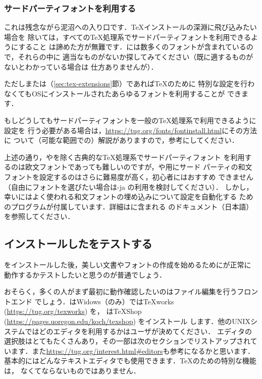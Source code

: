 \documentclass[uplatex,dvipdfmx,tombow]{jsarticle}
\begin{document}
\subsubsection{サードパーティフォントを利用する}

これは残念ながら泥沼への入り口です．\TeX インストールの深淵に飛び込みたい場合を
除いては，すべての\TeX 処理系でサードパーティフォントを利用できるようにすること
は諦めた方が無難です．\TL には数多くのフォントが含まれているので，それらの中に
適当なものがないか探してみてください（既に適するものがないとわかっている場合は
仕方ありませんが）．

ただし\XeTeX または\LuaTeX （\ref{sec:tex-extensions}節）であれば\TeX のために
特別な設定を行わなくてもOSにインストールされたあらゆるフォントを利用することが
できます．

もしどうしてもサードパーティフォントを一般の\TeX 処理系で利用できるように設定を
行う必要がある場合は，\url{https://tug.org/fonts/fontinstall.html}にその方法に
ついて（可能な範囲での）解説がありますので，参考にしてください．

\begin{janote}
上述の通り，\XeTeX や\LuaTeX を除く古典的な\TeX 処理系でサードパーティフォント
を利用するのは欧文フォントであっても難しいのですが，\pTeX や\upTeX 用にサード
パーティの和文フォントを設定するのはさらに難易度が高く，初心者にはおすすめ
できません（自由にフォントを選びたい場合は\LuaTeX-ja の利用を検討してください）．
しかし，幸い\TL にはよく使われる和文フォントの埋め込みについて設定を自動化する
ためのプログラムが付属しています．詳細は\TL に含まれる
のドキュメント（日本語）を参照してください．
\end{janote}

\subsection{インストールした\TL をテストする}
\label{sec:test-install}

\TL をインストールした後，美しい文書やフォントの作成を始めるために\TL が正常に
動作するかテストしたいと思うのが普通でしょう．

おそらく，多くの人がまず最初に動作確認したいのはファイル編集を行うフロントエンド
でしょう．\TL はWidows（のみ）では{\TeX}works (\url{https://tug.org/texworks}) を，
\MacTeX は{\TeX}Shop (\url{https://pages.uoregon.edu/koch/texshop}) をインストール
します．他のUNIXシステムではどのエディタを利用するかはユーザが決めてください．
エディタの選択肢はとてもたくさんあり，その一部は次のセクションでリストアップされて
います．また\url{https://tug.org/interest.html#editors}も参考になるかと思います．
基本的にはどんなテキストエディタでも使用できます．\TeX のための特別な機能は，
なくてならないものではありません．
\end{document}
